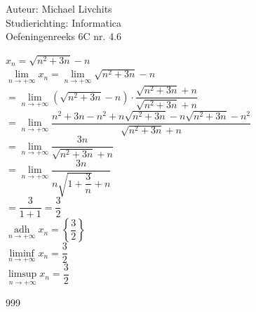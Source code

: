 \documentclass[a4paper]{article}
\begin{document}
  
\noindent \large Auteur: Michael Livchits \\
\noindent \large Studierichting: Informatica\\
\noindent \large Oefeningenreeks 6C nr. 4.6\\

\medskip

\normalsize

$x_n = \sqrt{n^2+3n}-n$\\

$\lim\limits_{n\rightarrow +\infty} x_n = \lim\limits_{n \rightarrow +\infty}\sqrt{n^2+3n}-n $\\

$= \lim\limits_{n\rightarrow +\infty}\left(\sqrt{n^2+3n}-n\right)\cdot\dfrac{\sqrt{n^2+3n}+n}{\sqrt{n^2+3n}+n}$\\

$= \lim\limits_{n\rightarrow +\infty}\dfrac{n^2+3n-n^2+n\sqrt{n^2+3n}-n\sqrt{n^2+3n}-n^2}{\sqrt{n^2+3n}+n}$\\

$= \lim\limits_{n\rightarrow +\infty}\dfrac{3n}{\sqrt{n^2+3n}+n}$\\

$= \lim\limits_{n\rightarrow +\infty}\dfrac{3n}{n\sqrt{1+\dfrac{3}{n}}+n}$\\

$= \dfrac{3}{1+1} = \dfrac{3}{2}$\\

$\operatorname*{adh}\limits_{n\rightarrow +\infty} x_n = \left\{\dfrac{3}{2}\right\}$\\

$\liminf\limits_{n\rightarrow +\infty} x_n = \dfrac{3}{2}$\\

$\limsup\limits_{n\rightarrow +\infty} x_n = \dfrac{3}{2}$\\

\begin{thebibliography}{999}
\end{thebibliography}
\end{document}
